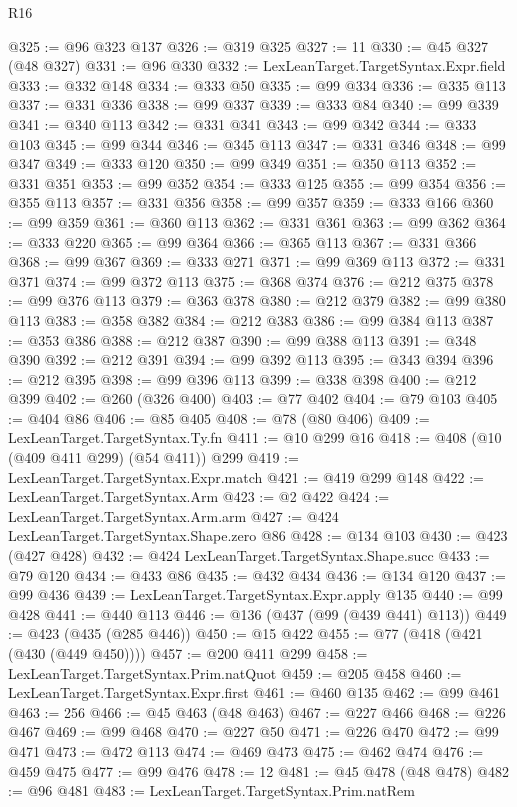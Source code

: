 \begin{lexlean}{R16}
\begin{coremodule}
@325 := @96 @323 @137
@326 := @319 @325
@327 := 11
@330 := @45 @327 (@48 @327)
@331 := @96 @330
@332 := LexLeanTarget.TargetSyntax.Expr.field
@333 := @332 @148
@334 := @333 @50
@335 := @99 @334
@336 := @335 @113
@337 := @331 @336
@338 := @99 @337
@339 := @333 @84
@340 := @99 @339
@341 := @340 @113
@342 := @331 @341
@343 := @99 @342
@344 := @333 @103
@345 := @99 @344
@346 := @345 @113
@347 := @331 @346
@348 := @99 @347
@349 := @333 @120
@350 := @99 @349
@351 := @350 @113
@352 := @331 @351
@353 := @99 @352
@354 := @333 @125
@355 := @99 @354
@356 := @355 @113
@357 := @331 @356
@358 := @99 @357
@359 := @333 @166
@360 := @99 @359
@361 := @360 @113
@362 := @331 @361
@363 := @99 @362
@364 := @333 @220
@365 := @99 @364
@366 := @365 @113
@367 := @331 @366
@368 := @99 @367
@369 := @333 @271
@371 := @99 @369 @113
@372 := @331 @371
@374 := @99 @372 @113
@375 := @368 @374
@376 := @212 @375
@378 := @99 @376 @113
@379 := @363 @378
@380 := @212 @379
@382 := @99 @380 @113
@383 := @358 @382
@384 := @212 @383
@386 := @99 @384 @113
@387 := @353 @386
@388 := @212 @387
@390 := @99 @388 @113
@391 := @348 @390
@392 := @212 @391
@394 := @99 @392 @113
@395 := @343 @394
@396 := @212 @395
@398 := @99 @396 @113
@399 := @338 @398
@400 := @212 @399
@402 := @260 (@326 @400)
@403 := @77 @402
@404 := @79 @103
@405 := @404 @86
@406 := @85 @405
@408 := @78 (@80 @406)
@409 := LexLeanTarget.TargetSyntax.Ty.fn
@411 := @10 @299 @16
@418 := @408 (@10 (@409 @411 @299) (@54 @411)) @299
@419 := LexLeanTarget.TargetSyntax.Expr.match
@421 := @419 @299 @148
@422 := LexLeanTarget.TargetSyntax.Arm
@423 := @2 @422
@424 := LexLeanTarget.TargetSyntax.Arm.arm
@427 := @424 LexLeanTarget.TargetSyntax.Shape.zero @86
@428 := @134 @103
@430 := @423 (@427 @428)
@432 := @424 LexLeanTarget.TargetSyntax.Shape.succ
@433 := @79 @120
@434 := @433 @86
@435 := @432 @434
@436 := @134 @120
@437 := @99 @436
@439 := LexLeanTarget.TargetSyntax.Expr.apply @135
@440 := @99 @428
@441 := @440 @113
@446 := @136 (@437 (@99 (@439 @441) @113))
@449 := @423 (@435 (@285 @446))
@450 := @15 @422
@455 := @77 (@418 (@421 (@430 (@449 @450))))
@457 := @200 @411 @299
@458 := LexLeanTarget.TargetSyntax.Prim.natQuot
@459 := @205 @458
@460 := LexLeanTarget.TargetSyntax.Expr.first
@461 := @460 @135
@462 := @99 @461
@463 := 256
@466 := @45 @463 (@48 @463)
@467 := @227 @466
@468 := @226 @467
@469 := @99 @468
@470 := @227 @50
@471 := @226 @470
@472 := @99 @471
@473 := @472 @113
@474 := @469 @473
@475 := @462 @474
@476 := @459 @475
@477 := @99 @476
@478 := 12
@481 := @45 @478 (@48 @478)
@482 := @96 @481
@483 := LexLeanTarget.TargetSyntax.Prim.natRem

\end{coremodule}
\end{lexlean}
